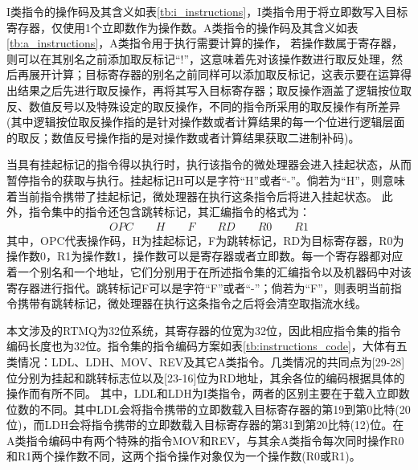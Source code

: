 I类指令的操作码及其含义如表\ref{tb:i_instructions}，I类指令用于将立即数写入目标寄存器，仅使用1个立即数作为操作数。A类指令的操作码及其含义如表\ref{tb:a_instructions}，A类指令用于执行需要计算的操作，
若操作数属于寄存器，则可以在其别名之前添加取反标记“!”，这意味着先对该操作数进行取反处理，然后再展开计算；目标寄存器的别名之前同样可以添加取反标记，这表示要在运算得出结果之后先进行取反操作，再将其写入目标寄存器；取反操作涵盖了逻辑按位取反、数值反号以及特殊设定的取反操作，不同的指令所采用的取反操作有所差异(其中逻辑按位取反操作指的是针对操作数或者计算结果的每一个位进行逻辑层面的取反；数值反号操作指的是对操作数或者计算结果获取二进制补码)。


当具有挂起标记的指令得以执行时，执行该指令的微处理器会进入挂起状态，从而暂停指令的获取与执行。挂起标记H可以是字符“H”或者“-”。倘若为“H”，则意味着当前指令携带了挂起标记，微处理器在执行这条指令后将进入挂起状态。
此外，指令集中的指令还包含跳转标记，其汇编指令的格式为：
\begin{align}
    OPC \qquad H \qquad F \qquad RD \qquad R0 \qquad R1
\end{align}
其中，OPC代表操作码，H为挂起标记，F为跳转标记，RD为目标寄存器，R0为操作数0，R1为操作数1，操作数可以是寄存器或者立即数。每一个寄存器都对应着一个别名和一个地址，它们分别用于在所述指令集的汇编指令以及机器码中对该寄存器进行指代。跳转标记F可以是字符“F”或者“-”；倘若为“F”，则表明当前指令携带有跳转标记，微处理器在执行这条指令之后将会清空取指流水线。





本文涉及的RTMQ为32位系统，其寄存器的位宽为32位，因此相应指令集的指令编码长度也为32位。指令集的指令编码方案如表\ref{tb:instructions_code}，大体有五类情况：LDL、LDH、MOV、REV及其它A类指令。几类情况的共同点为[29-28]位分别为挂起和跳转标志位以及[23-16]位为RD地址，其余各位的编码根据具体的操作而有所不同。
其中，LDL和LDH为I类指令，两者的区别主要在于载入立即数位数的不同。其中LDL会将指令携带的立即数载入目标寄存器的第19到第0比特(20位)，而LDH会将指令携带的立即数载入目标寄存器的第31到第20比特(12)位。在A类指令编码中有两个特殊的指令MOV和REV，与其余A类指令每次同时操作R0和R1两个操作数不同，这两个指令操作对象仅为一个操作数(R0或R1)。

